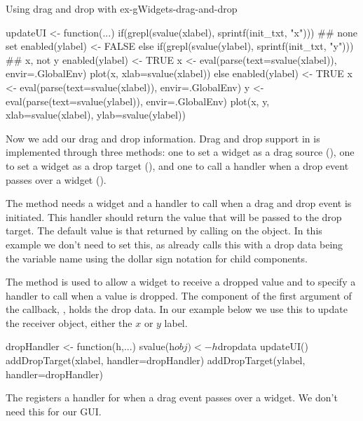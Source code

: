 \begin{example}{Using drag and drop with }{ex-gWidgets-drag-and-drop}
\begin{Schunk}
\begin{Sinput}
 updateUI <- function(...) {
   if(grepl(svalue(xlabel), sprintf(init_txt, "x"))) {
     ## none set
     enabled(ylabel) <- FALSE
   } else if(grepl(svalue(ylabel), sprintf(init_txt, "y"))) {
     ## x, not y
     enabled(ylabel) <- TRUE
     x <- eval(parse(text=svalue(xlabel)), envir=.GlobalEnv)
     plot(x, xlab=svalue(xlabel))
   } else {
     enabled(ylabel) <- TRUE    
     x <- eval(parse(text=svalue(xlabel)), envir=.GlobalEnv)
     y <- eval(parse(text=svalue(ylabel)), envir=.GlobalEnv)
     plot(x, y, xlab=svalue(xlabel), ylab=svalue(ylabel))
   }
 }
\end{Sinput}
\end{Schunk}

Now we add our drag and drop information.  Drag and drop support in
 is implemented through three methods: one to set a
widget as a drag source (), one to set a widget
as a drop target (), and one to call a handler
when a drop event passes over a widget ().
  

The  method needs a widget and a handler to
call when a drag and drop event is initiated. This handler should
return the value that will be passed to the drop target. The default
value is that returned by calling  on the object. In this
example we don't need to set this, as  already
calls this with a drop data being the variable name using the dollar
sign notation for child components.
    
The  method is used to allow a widget to
receive a dropped value and to specify a handler to call when a value
is dropped. The  component of the first argument of the
callback, , holds the drop data. In our example below we use
this to update the receiver object, either the $x$ or $y$ label.

\begin{Schunk}
\begin{Sinput}
 dropHandler <- function(h,...) {
   svalue(h$obj) <- h$dropdata
   updateUI()
 }
 addDropTarget(xlabel, handler=dropHandler)
 addDropTarget(ylabel, handler=dropHandler)
\end{Sinput}
\end{Schunk}


The  registers a handler for when a drag event
passes over a widget. We don't need this for our GUI.
    
\end{example}



